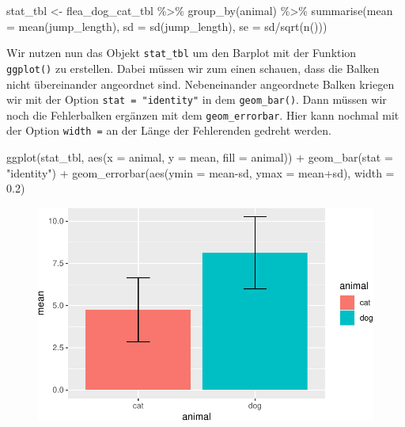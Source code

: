 \documentclass[
  letterpaper,
]{scrbook}
\newenvironment{Shaded}{\begin{snugshade}}{\end{snugshade}}
\newcommand{\AttributeTok}[1]{\textcolor[rgb]{0.40,0.45,0.13}{#1}}
\newcommand{\FloatTok}[1]{\textcolor[rgb]{0.68,0.00,0.00}{#1}}
\newcommand{\FunctionTok}[1]{\textcolor[rgb]{0.28,0.35,0.67}{#1}}
\newcommand{\NormalTok}[1]{\textcolor[rgb]{0.00,0.23,0.31}{#1}}
\newcommand{\OtherTok}[1]{\textcolor[rgb]{0.00,0.23,0.31}{#1}}
\newcommand{\SpecialCharTok}[1]{\textcolor[rgb]{0.37,0.37,0.37}{#1}}
\newcommand{\StringTok}[1]{\textcolor[rgb]{0.13,0.47,0.30}{#1}}
\begin{document}
\begin{Shaded}
\begin{Highlighting}[]
\NormalTok{stat\_tbl }\OtherTok{\textless{}{-}}\NormalTok{ flea\_dog\_cat\_tbl }\SpecialCharTok{\%\textgreater{}\%} 
  \FunctionTok{group\_by}\NormalTok{(animal) }\SpecialCharTok{\%\textgreater{}\%} 
  \FunctionTok{summarise}\NormalTok{(}\AttributeTok{mean =} \FunctionTok{mean}\NormalTok{(jump\_length),}
            \AttributeTok{sd =} \FunctionTok{sd}\NormalTok{(jump\_length),}
            \AttributeTok{se =}\NormalTok{ sd}\SpecialCharTok{/}\FunctionTok{sqrt}\NormalTok{(}\FunctionTok{n}\NormalTok{()))}
\end{Highlighting}
\end{Shaded}

Wir nutzen nun das Objekt \texttt{stat\_tbl} um den Barplot mit der
Funktion \texttt{ggplot()} zu erstellen. Dabei müssen wir zum einen
schauen, dass die Balken nicht übereinander angeordnet sind.
Nebeneinander angeordnete Balken kriegen wir mit der Option
\texttt{stat\ =\ "identity"} in dem \texttt{geom\_bar()}. Dann müssen
wir noch die Fehlerbalken ergänzen mit dem \texttt{geom\_errorbar}. Hier
kann nochmal mit der Option \texttt{width\ =} an der Länge der
Fehlerenden gedreht werden.

\begin{Shaded}
\begin{Highlighting}[]
\FunctionTok{ggplot}\NormalTok{(stat\_tbl, }\FunctionTok{aes}\NormalTok{(}\AttributeTok{x =}\NormalTok{ animal, }\AttributeTok{y =}\NormalTok{ mean, }\AttributeTok{fill =}\NormalTok{ animal)) }\SpecialCharTok{+} 
    \FunctionTok{geom\_bar}\NormalTok{(}\AttributeTok{stat =} \StringTok{"identity"}\NormalTok{) }\SpecialCharTok{+}
    \FunctionTok{geom\_errorbar}\NormalTok{(}\FunctionTok{aes}\NormalTok{(}\AttributeTok{ymin =}\NormalTok{ mean}\SpecialCharTok{{-}}\NormalTok{sd, }\AttributeTok{ymax =}\NormalTok{ mean}\SpecialCharTok{+}\NormalTok{sd),}
                  \AttributeTok{width =} \FloatTok{0.2}\NormalTok{)}
\end{Highlighting}
\end{Shaded}

\begin{figure}[H]

{\centering \includegraphics{./eda-ggplot_files/figure-pdf/unnamed-chunk-20-1.pdf}

}

\end{figure}
\end{document}
